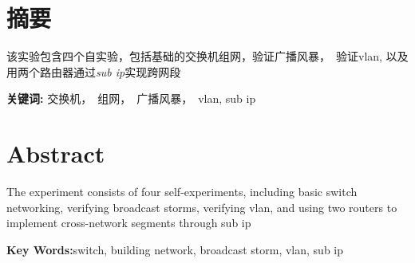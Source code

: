 \section*{ \centering 摘要}

\vskip0.5cm
该实验包含四个自实验，包括基础的交换机组网，验证广播风暴，　验证vlan, 以及用两个路由器通过\emph{sub ip}实现跨网段

\textbf{关键词:}  交换机，　组网，　广播风暴，　vlan, sub ip

\clearpage
\section*{ \centering \textbf{Abstract} }
The experiment consists of four self-experiments, including basic switch networking, verifying broadcast storms, verifying vlan, and using two routers to implement cross-network segments through sub ip

\textbf{Key Words:}switch, building network, broadcast storm, vlan, sub ip




